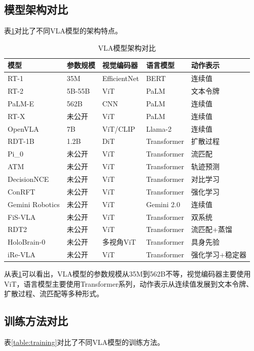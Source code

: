 \documentclass[12pt,a4paper]{article}
\begin{document}
\subsection{模型架构对比}

表\ref{table:architecture}对比了不同VLA模型的架构特点。

\begin{table}[h]
\centering
\caption{VLA模型架构对比}\label{table:architecture}
\small
\begin{tabular}{lp{2cm}p{2cm}p{2.5cm}p{2.5cm}}
\toprule
模型 & 参数规模 & 视觉编码器 & 语言模型 & 动作表示 \\
\midrule
RT-1 & 35M & EfficientNet & BERT & 连续值 \\
RT-2 & 5B-55B & ViT & PaLM & 文本令牌 \\
PaLM-E & 562B & CNN & PaLM & 连续值 \\
RT-X & 未公开 & ViT & PaLM & 连续值 \\
OpenVLA & 7B & ViT/CLIP & Llama-2 & 连续值 \\
RDT-1B & 1.2B & DiT & Transformer & 扩散过程 \\
Pi\_0 & 未公开 & ViT & Transformer & 流匹配 \\
ATM & 未公开 & ViT & Transformer & 轨迹预测 \\
DecisionNCE & 未公开 & ViT & Transformer & 对比学习 \\
ConRFT & 未公开 & ViT & Transformer & 强化学习 \\
Gemini Robotics & 未公开 & ViT & Gemini 2.0 & 连续值 \\
FiS-VLA & 未公开 & ViT & Transformer & 双系统 \\
RDT2 & 未公开 & ViT & Transformer & 流匹配+蒸馏 \\
HoloBrain-0 & 未公开 & 多视角ViT & Transformer & 具身先验 \\
iRe-VLA & 未公开 & ViT & Transformer & 强化学习+稳定器 \\
\bottomrule
\end{tabular}
\end{table}

从表\ref{table:architecture}可以看出，VLA模型的参数规模从35M到562B不等，视觉编码器主要使用ViT，语言模型主要使用Transformer系列，动作表示从连续值发展到文本令牌、扩散过程、流匹配等多种形式。

\subsection{训练方法对比}

表\ref{table:training}对比了不同VLA模型的训练方法。
\end{document}
